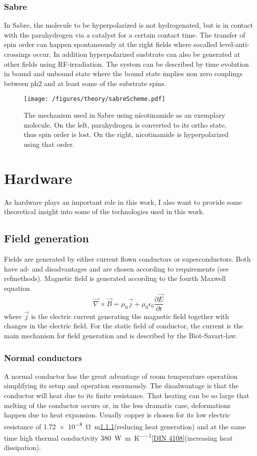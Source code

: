         \subsubsection{Sabre}
        In Sabre, the molecule to be hyperpolarized is not hydrogenated, but is in contact with the parahydrogen via a catalyst for a certain contact time. The transfer of spin order can happen spontaneously at the right fields where socalled level-anti-crossings occur. In addition hyperpolarized susbtrate can also be generated at other fields using RF-irradiation. The system can be described by time evolution in bound and unbound state where the bound state implies non zero couplings between ph2 and at least some of the substrate spins.
        \begin{figure}
            \texttt{[image: /figures/theory/sabreScheme.pdf]}
            \caption[Sabre scheme]{The mechanism used in Sabre using nicotinamide as an exemplary molecule. On the left, parahydrogen is converted to its ortho state, thus spin order is lost. On the right, nicotinamide is hyperpolarized using that order.}
        \end{figure}
        \section{Hardware}
            As hardware plays an important role in this work, I also want to provide some theoretical insight into some of the technologies used in this work.
            \subsection{Field generation}
                Fields are generated by either current flown conductors or superconductors. Both have ad- and disadvantages and are chosen according to requirements (see ref{methods}). Magnetic field is generated according to the fourth Maxwell equation
                \begin{equation}
                    \vec\nabla\times\vec B = \mu_0\vec j+\mu_0\epsilon_0\frac{\partial\vec E}{\partial t}
                \end{equation}
                where $\vec j$ is the electric current generating the magnetic field together with changes in the electric field. For the static field of conductor, the current is the main mechanism for field generation and is described by the Biot-Savart-law.
                \subsubsection{Normal conductors}
                A normal conductor has the great advantage of room temperature operatiion simplifying its setup and operation enormously. The disadwantage is that the conductor will heat due to its finite resistance. That heating can be so large that melting of the conductor occurs or, in the less dramatic case, deformations happen due to heat expansion. Usually copper is chosen for its low electric resistance of \SI{1.72e-8}{\ohm\meter}\ref{}(reducing heat generation) and at the same time high thermal conductivity \SI{380}{\watt\per\m\per\kelvin}\ref{DIN 4108}(increasing heat dissipation). 
